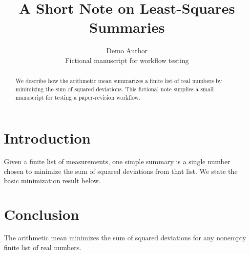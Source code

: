 \documentclass[11pt]{article}
\title{A Short Note on Least-Squares Summaries}
\author{Demo Author\\\small Fictional manuscript for workflow testing}
\date{}
\begin{document}
\maketitle

\begin{abstract}
We describe how the arithmetic mean summarizes a finite list of real
numbers by minimizing the sum of squared deviations. This fictional
note supplies a small manuscript for testing a paper-revision workflow.
\end{abstract}

\section{Introduction}
Given a finite list of measurements, one simple summary is a single
number chosen to minimize the sum of squared deviations from that list.
We state the basic minimization result below.



\section{Conclusion}
The arithmetic mean minimizes the sum of squared deviations for any
nonempty finite list of real numbers.
\end{document}
